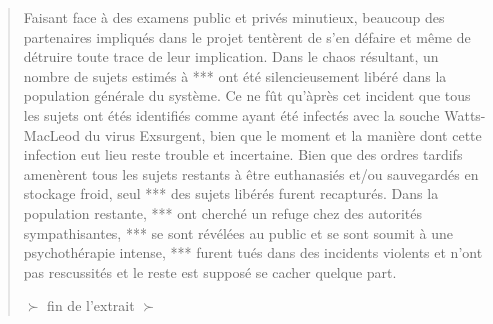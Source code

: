 \begin{quotation}
Faisant face à des examens public et privés minutieux, beaucoup des partenaires impliqués dans le projet tentèrent de s'en défaire  et même de détruire toute trace de leur implication. Dans le chaos résultant, un nombre de sujets estimés à *** ont été silencieusement libéré dans la population générale du système. Ce ne fût qu'àprès cet incident que tous les sujets ont étés identifiés comme ayant été infectés avec la souche Watts-MacLeod du virus Exsurgent, bien que le moment et la manière dont cette infection eut lieu reste trouble et incertaine. Bien que des ordres tardifs amenèrent tous les sujets restants à être euthanasiés et/ou sauvegardés en stockage froid, seul *** des sujets libérés furent recapturés. Dans la population restante, *** ont cherché un refuge chez des autorités sympathisantes, *** se sont révélées au public et se sont soumit à une psychothérapie intense, *** furent tués dans des incidents violents et n'ont pas rescussités et le reste est supposé se cacher quelque part. 

$\succ$ fin de l'extrait $\succ$ \end{quotation} 
